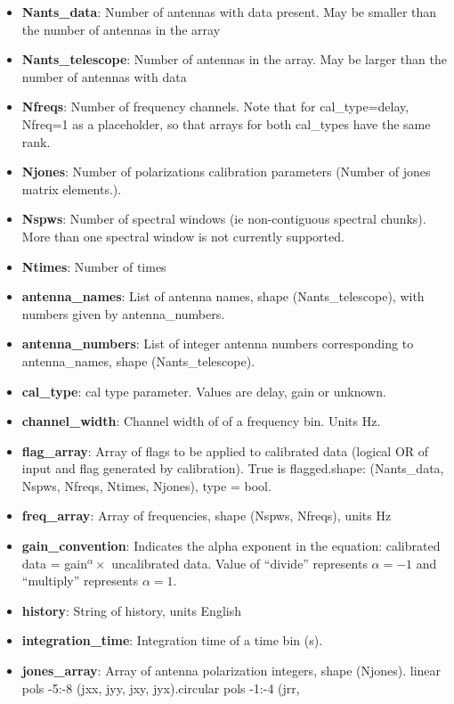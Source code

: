 \documentclass[11pt, oneside]{article}   	%
\begin{document}
\begin{itemize}
\item{\textbf{Nants\_data}: Number of antennas with data present. May be smaller
    than the number of antennas in the array}
\item{\textbf{Nants\_telescope}: Number of antennas in the array. May be larger
    than the number of antennas with data}
\item{\textbf{Nfreqs}: Number of frequency channels. Note that for
    cal\_type=delay, Nfreq=1 as a placeholder, so that arrays for both
    cal\_types have the same rank.}
\item{\textbf{Njones}: Number of polarizations calibration parameters (Number of
    jones matrix elements.).}
\item{\textbf{Nspws}: Number of spectral windows (ie non-contiguous spectral
    chunks). More than one spectral window is not currently supported.}
\item{\textbf{Ntimes}: Number of times}
\item{\textbf{antenna\_names}: List of antenna names, shape (Nants\_telescope),
    with numbers given by antenna\_numbers.}
\item{\textbf{antenna\_numbers}: List of integer antenna numbers corresponding
    to antenna\_names, shape (Nants\_telescope).}
\item{\textbf{cal\_type}: cal type parameter. Values are delay, gain or
    unknown.}
\item{\textbf{channel\_width}: Channel width of of a frequency bin. Units Hz.}
\item{\textbf{flag\_array}: Array of flags to be applied to calibrated data
    (logical OR of input and flag generated by calibration). True is
    flagged.shape: (Nants\_data, Nspws, Nfreqs, Ntimes, Njones), type = bool.}
\item{\textbf{freq\_array}: Array of frequencies, shape (Nspws, Nfreqs), units
    Hz}
\item{\textbf{gain\_convention}: Indicates the alpha exponent in the equation:
    calibrated data = gain$^{\alpha} \times $ uncalibrated data. Value of
    ``divide'' represents $\alpha=-1$ and ``multiply'' represents $\alpha=1$.}
\item{\textbf{history}: String of history, units English}
\item{\textbf{integration\_time}: Integration time of a time bin (s).}
\item{\textbf{jones\_array}: Array of antenna polarization integers, shape
    (Njones). linear pols -5:-8 (jxx, jyy, jxy, jyx).circular pols -1:-4 (jrr,
}
\end{itemize}
\end{document}
